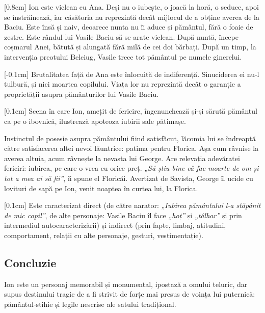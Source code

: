 [0.8cm]
Ion este viclean cu Ana. Deși nu o iubește, o joacă la horă, o seduce, apoi se înstrăinează, iar căsătoria nu reprezintă decât mijlocul de a obține averea de la Baciu. Este însă și naiv, deoarece nunta nu îi aduce și pământul, fără o foaie de zestre. Este rândul lui Vasile Baciu să se arate viclean. După nuntă, începe coșmarul Anei, bătută și alungată fără milă de cei doi bărbați. După un timp, la intervenția preotului Belciug, Vasile trece tot pământul pe numele ginerelui.

[-0.1cm]
Brutalitatea față de Ana este înlocuită de indiferență. Sinuciderea ei nu-l tulbură, și nici moartea copilului. Viața lor nu reprezintă decât o garanție a proprietății asupra pământurilor lui Vasile Baciu.

[0.1cm]
Scena în care Ion, amețit de fericire, îngenunchează și-și sărută pământul ca pe o ibovnică, ilustrează apoteoza iubirii sale pătimașe.

Instinctul de posesie asupra pământului fiind satisfăcut, lăcomia lui se îndreaptă către satisfacerea altei nevoi lăuntrice: patima pentru Florica. Așa cum râvnise la averea altuia, acum râvnește la nevasta lui George. Are relevația adevăratei fericiri: iubirea, pe care o vrea cu orice preț. \textit{„Să știu bine că fac moarte de om și tot a mea ai să fii”}, îi spune el Floricăi. Avertizat de Savista, George îl ucide cu lovituri de sapă pe Ion, venit noaptea în curtea lui, la Florica.

[0.1cm]
Este caracterizat direct (de către narator: \textit{„Iubirea pământului l-a stăpânit de mic copil”}, de alte personaje: Vasile Baciu îl face \textit{„hoț”} și \textit{„tâlhar”} și prin intermediul autocaracterizării) și indirect (prin fapte, limbaj, atitudini, comportament, relații cu alte personaje, gesturi, vestimentație).


\subsection{Concluzie}

Ion este un personaj memorabil și monumental, ipostază a omului teluric, dar supus destinului tragic de a fi strivit de forțe mai presus de voința lui puternică: pământul-stihie și legile nescrise ale satului tradițional.

